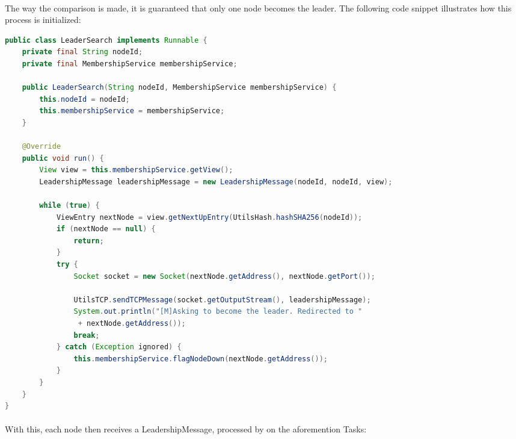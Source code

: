 \documentclass{report}
\begin{document}
	        	\paragraph{}The way the comparison is made, it is guaranteed that only one node becomes the leader. The following code snippet illustrates how this process is initialized:
	        	
	        	\vspace{.5cm}	        	
	        	\begin{adjustbox}{center}
	        	\begin{lstlisting}[language=java]
public class LeaderSearch implements Runnable {
	private final String nodeId;
	private final MembershipService membershipService;
	
	public LeaderSearch(String nodeId, MembershipService membershipService) {
		this.nodeId = nodeId;
		this.membershipService = membershipService;
	}
	
	@Override
	public void run() {
		View view = this.membershipService.getView();
		LeadershipMessage leadershipMessage = new LeadershipMessage(nodeId, nodeId, view);
		
		while (true) {
			ViewEntry nextNode = view.getNextUpEntry(UtilsHash.hashSHA256(nodeId));
			if (nextNode == null) {
				return;
			}
			try {
				Socket socket = new Socket(nextNode.getAddress(), nextNode.getPort());
				
				UtilsTCP.sendTCPMessage(socket.getOutputStream(), leadershipMessage);
				System.out.println("[M]Asking to become the leader. Redirected to "
				 + nextNode.getAddress());
				break;
			} catch (Exception ignored) {
				this.membershipService.flagNodeDown(nextNode.getAddress());
			}
		}
	}
}

	        	\end{lstlisting}
        	\end{adjustbox}
        
        	\paragraph{}With this, each node then receives a LeadershipMessage, processed by on the aforemention Tasks:
        	
\end{document}
